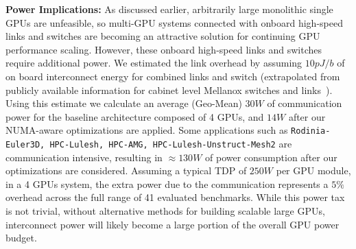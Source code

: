 \textbf{Power Implications:} As discussed earlier, arbitrarily large monolithic 
single GPUs are unfeasible, so multi-GPU systems connected with onboard 
high-speed links and switches are becoming an attractive solution for continuing 
GPU performance scaling. However, these onboard high-speed links and switches 
require additional power. We estimated the link overhead by assuming $10 pJ/b$ of 
on board interconnect energy for combined links and switch (extrapolated from 
publicly available information for cabinet level Mellanox switches and 
links~\cite{mlswitch,mlnic}). Using this estimate we calculate an average 
(Geo-Mean) $30 W$ of communication power for the baseline 
architecture composed of 4 GPUs, and $14 W$ after 
our NUMA-aware optimizations are applied. Some applications such as 
\texttt{Rodinia-Euler3D, HPC-Lulesh, HPC-AMG, HPC-Lulesh-Unstruct-Mesh2} are 
communication intensive, resulting in $\approx 130 W$ of power consumption after our 
optimizations are considered. Assuming a typical TDP of $250 W$ per GPU module, 
in a 4 GPUs system, the extra power due to the communication represents a $5\%$ 
overhead across the full range of 41 evaluated benchmarks.  While this power
tax is not trivial, without alternative methods for building scalable large
GPUs, interconnect power will likely become a large portion of the overall
GPU power budget.
